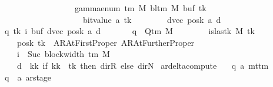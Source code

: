 \begin{isabellebody}
\ \ \ \ \ \ \ \ \ \ \ \ \ \ \ \ \ \ \ \ {\isacharparenleft}{\kern0pt}{}\ {\isacharasterisk}{\kern0pt}\ gamma{\isacharunderscore}{\kern0pt}enum\ {\isacharparenleft}{\kern0pt}{\isasymGamma}{\isacharunderscore}{\kern0pt}tm\ M{\isacharparenright}{\kern0pt}\ {\isacharparenleft}{\kern0pt}bl{\isacharunderscore}{\kern0pt}tm\ M{\isacharparenright}{\kern0pt}\ {\isacharparenleft}{\kern0pt}buf\ tk{\isacharparenright}{\kern0pt}\isanewline
\ \ \ \ \ \ \ \ \ \ \ \ \ \ \ \ \ \ \ \ \ \ \ {\isacharplus}{\kern0pt}\ bit{\isacharunderscore}{\kern0pt}value\ {\isacharparenleft}{\kern0pt}a\ tk{\isacharparenright}{\kern0pt}{\isacharparenright}{\kern0pt}{\isacharparenright}{\kern0pt}{\isacharcomma}{\kern0pt}\isanewline
\ \ \ \ \ \ \ \ dvec{\isacharcomma}{\kern0pt}\ posk{\isacharparenright}{\kern0pt}{\isacharcomma}{\kern0pt}\ a{\isacharcomma}{\kern0pt}\ d{\isacharparenright}{\kern0pt}\ {\isacharbar}{\kern0pt}\isanewline
\ \ \ \ \ q\ tk\ i\ buf\ dvec\ posk\ a\ d{\isachardot}{\kern0pt}\isanewline
\ \ \ \ \ \ \ q\ {\isasymin}\ Q{\isacharunderscore}{\kern0pt}tm\ M\isanewline
\ \ \ \ \ \ \ {\isasymand}\ is{\isacharunderscore}{\kern0pt}last{\isacharunderscore}{\kern0pt}k\ M\ tk\isanewline
\ \ \ \ \ \ \ {\isasymand}\ posk\ tk\ {\isasymin}\ {\isacharbraceleft}{\kern0pt}AR{\isacharunderscore}{\kern0pt}AtFirstProper{\isacharcomma}{\kern0pt}\ AR{\isacharunderscore}{\kern0pt}AtFurtherProper{\isacharbraceright}{\kern0pt}\isanewline
\ \ \ \ \ \ \ {\isasymand}\ i\ {\isacharequal}{\kern0pt}\ Suc\ {\isacharparenleft}{\kern0pt}block{\isacharunderscore}{\kern0pt}width\ {\isacharparenleft}{\kern0pt}{\isasymGamma}{\isacharunderscore}{\kern0pt}tm\ M{\isacharparenright}{\kern0pt}{\isacharparenright}{\kern0pt}\isanewline
\ \ \ \ \ \ \ {\isasymand}\ d\ {\isacharequal}{\kern0pt}\ {\isacharparenleft}{\kern0pt}{\isasymlambda}kk{\isachardot}{\kern0pt}\ if\ kk\ {\isacharequal}{\kern0pt}\ tk\ then\ dir{\isachardot}{\kern0pt}R\ else\ dir{\isachardot}{\kern0pt}N{\isacharparenright}{\kern0pt}{\isacharbraceright}{\kern0pt}{\isachardoublequoteclose}\isanewline
\isanewline
{}\isamarkupfalse%
\ ar{\isacharunderscore}{\kern0pt}delta{\isacharunderscore}{\kern0pt}compute\ {\isacharcolon}{\kern0pt}{\isacharcolon}{\kern0pt}\isanewline
\ \ {\isachardoublequoteopen}{\isacharparenleft}{\kern0pt}{\isacharprime}{\kern0pt}q{\isacharcomma}{\kern0pt}\ {\isacharprime}{\kern0pt}a{\isacharparenright}{\kern0pt}\ mttm\isanewline
\ \ \ \ {\isasymRightarrow}\ {\isacharparenleft}{\kern0pt}{\isacharparenleft}{\kern0pt}{\isacharprime}{\kern0pt}q\ {\isasymtimes}\ {\isacharprime}{\kern0pt}a\ ar{\isacharunderscore}{\kern0pt}stage{\isacharparenright}{\kern0pt}\isanewline

\end{isabellebody}
